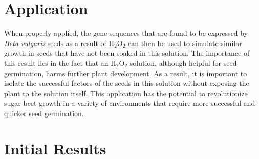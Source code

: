 \documentclass{article}
\begin{document}
\section{Application}
	When properly applied, the gene sequences that are found to be expressed by \emph{Beta vulgaris} seeds as a result of H$_{2}$O$_{2}$ can then be used to simulate similar growth in seeds that have not been soaked in this solution. The importance of this result lies in the fact that an H$_{2}$O$_{2}$ solution, although helpful for seed germination, harms further plant development. As a result, it is important to isolate the successful factors of the seeds in this solution without exposing the plant to the solution itself. This application has the potential to revolutionize sugar beet growth in a variety of environments that require more successful and quicker seed germination.

\section{Initial Results}
\end{document}
